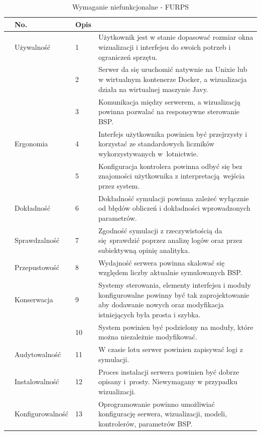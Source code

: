 \documentclass[15pt]{sprawozdanie}
\begin{document}
\renewcommand{\arraystretch}{1.5}
\begin{table}[!h]
	\centering
	\begin{tabular}{|m{}|m{}|m{}|m{}|} 
		\hline
		\rowcolor{Gray}		\multicolumn{2}{c}{Wymagania} & No. & Opis \\
		\hline
		\centering \multirow{9}{*}{\rotatebox[origin=c]{90}{Usability}}
		&\multirow{1}{*}{Używalność} 
		& 1 & Użytkownik jest w stanie dopasować rozmiar okna wizualizacji i interfejsu do swoich potrzeb i ograniczeń sprzętu. \\
		\cline{3-4}
		& & 2 & Serwer da się uruchomić natywnie na Unixie lub w wirtualnym kontenerze Docker, a wizualizacja działa na wirtualnej maszynie Javy. \\
		\cline{3-4}
		& & 3 & Komunikacja między serwerem, a wizualizacją powinna pozwalać na responsywne sterowanie BSP. \\
		\cline{2-4}
		& \multirow{1}{*}{Ergonomia} 
		& 4 & Interfejs użytkownika powinien być przejrzysty i korzystać ze standardowych liczników wykorzystywanych w~lotnictwie.  \\
		\cline{3-4}
		& & 5 & Konfiguracja kontrolera powinna odbyć się bez znajomości użytkownika z interpretacją wejścia przez system.  \\
		\hline
		\centering \multirow{3.5}{*}{\rotatebox[origin=c]{90}{Reliability}}
		& \multirow{1}{*}{Dokładność} 
		& 6 & Dokładność symulacji powinna zależeć wyłącznie od błędów obliczeń i dokładności wprowadzonych parametrów. \\
		\cline{2-4}
		& \multirow{1}{*}{Sprawdzalność} 
		& 7 & Zgodność symulacji z rzeczywistością da się sprawdzić poprzez analizę logów oraz przez subiektywną opinię analityka. \\
		\hline
		\centering \multirow{1}{*}{\rotatebox[origin=c]{90}{Perf.}}
		& \multirow{1}{*}{Przepustowość} 
		& 8 & Wydajność serwera powinna skalować się względem liczby aktualnie symulowanych BSP. \\
		\hline
		\centering \multirow{7}{*}{\rotatebox[origin=c]{90}{Supportability}}
		& \multirow{1}{*}{Konserwacja} 
		& 9 &Systemy sterowania, elementy interfejsu i moduły konfigurowalne powinny być tak zaprojektowanie aby dodawanie nowych oraz modyfikacja istniejących była prosta i szybka.  \\
		\cline{3-4}
		& & 10 & System powinien być podzielony na moduły, które można niezależnie modyfikować. \\
		\cline{2-4}
		& \multirow{1}{*}{Audytowalność} 
		& 11 & W czasie lotu serwer powinien zapisywać logi z symulacji. \\
		\cline{2-4}
		& \multirow{1}{*}{Instalowalność} 
		& 12 & Proces instalacji serwera powinien być dobrze opisany i~prosty. Niewymagany w przypadku wizualizacji. \\
		\cline{2-4}
		& \multirow{1}{*}{Konfigurowalność} 
		& 13 & Oprogramowanie powinno umożliwiać konfigurację serwera, wizualizacji, modeli, kontrolerów, parametrów BSP. \\
		\hline
	\end{tabular}
	\caption{Wymaganie niefunkcjonalne - FURPS}
	\label{non_func}
\end{table}
\end{document}
